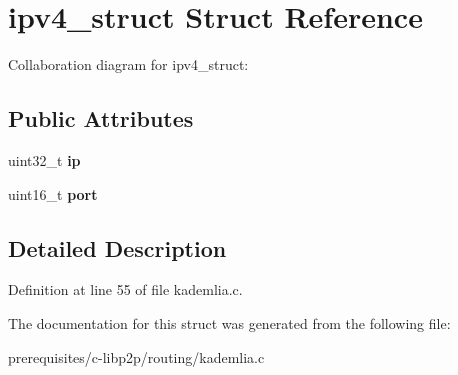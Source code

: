 \hypertarget{structipv4__struct}{}\section{ipv4\+\_\+struct Struct Reference}
\label{structipv4__struct}


Collaboration diagram for ipv4\+\_\+struct\+:
\subsection*{Public Attributes}
\begin{DoxyCompactItemize}
\item 
\mbox{\label{structipv4__struct_aac4b9b6061772839f7daff55ba7eca28}} 
uint32\+\_\+t {\bfseries ip}
\item 
\mbox{\label{structipv4__struct_a8dd14f8add7ae600ee0051f439eeff1b}} 
uint16\+\_\+t {\bfseries port}
\end{DoxyCompactItemize}


\subsection{Detailed Description}


Definition at line 55 of file kademlia.\+c.



The documentation for this struct was generated from the following file\+:\begin{DoxyCompactItemize}
\item 
prerequisites/c-\/libp2p/routing/kademlia.\+c\end{DoxyCompactItemize}
